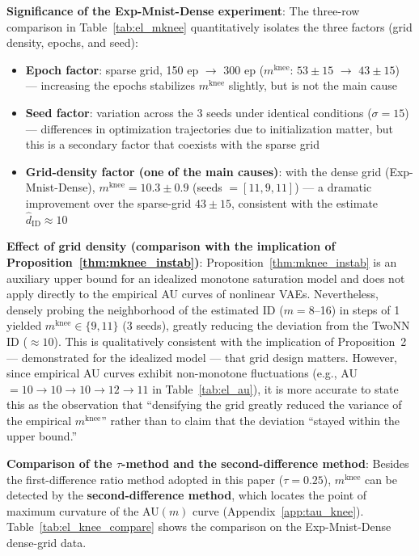 \documentclass[make,article,submit,pdftex,moreauthors]{Definitions/mdpi}
\newcommand{\mknee}{m^{\mathrm{knee}}}
\begin{document}
\textbf{Significance of the Exp-Mnist-Dense experiment}:
The three-row comparison in Table~\ref{tab:el_mknee} quantitatively isolates the three
factors (grid density, epochs, and seed):
\begin{itemize}
  \item \textbf{Epoch factor}: sparse grid, 150 ep $\to$ 300 ep ($\mknee$: $53\pm15$ $\to$ $43\pm15$) --- increasing the epochs stabilizes $\mknee$ slightly, but is not the main cause
  \item \textbf{Seed factor}: variation across the 3 seeds under identical conditions ($\sigma = 15$) --- differences in optimization trajectories due to initialization matter, but this is a secondary factor that coexists with the sparse grid
  \item \textbf{Grid-density factor (one of the main causes)}: with the dense grid (Exp-Mnist-Dense), $\mknee = 10.3 \pm 0.9$ (seeds $=[11,9,11]$) --- a dramatic improvement over the sparse-grid $43\pm15$, consistent with the estimate $\hat{d}_\mathrm{ID} \approx 10$
\end{itemize}

\noindent
\textbf{Effect of grid density (comparison with the implication of Proposition~\ref{thm:mknee_instab})}:
Proposition~\ref{thm:mknee_instab} is an auxiliary upper bound for an idealized monotone
saturation model and does not apply directly to the empirical AU curves of nonlinear VAEs.
Nevertheless, densely probing the neighborhood of the estimated ID ($m = 8$--16) in steps of 1
yielded $\mknee \in \{9, 11\}$ (3 seeds), greatly reducing the deviation from the TwoNN ID
($\approx 10$).
This is qualitatively consistent with the implication of Proposition~2 --- demonstrated for
the idealized model --- that grid design matters.
However, since empirical AU curves exhibit non-monotone fluctuations
(e.g., AU$=10 \to 10 \to 10 \to 12 \to 11$ in Table~\ref{tab:el_au}), it is more accurate to
state this as the observation that ``densifying the grid greatly reduced the variance of the
empirical $\mknee$'' rather than to claim that the deviation ``stayed within the upper bound.''

\noindent
\textbf{Comparison of the $\tau$-method and the second-difference method}:
Besides the first-difference ratio method adopted in this paper ($\tau = 0.25$), $\mknee$ can
be detected by the \textbf{second-difference method}, which locates the point of maximum
curvature of the AU$(m)$ curve (Appendix~\ref{app:tau_knee}).
Table~\ref{tab:el_knee_compare} shows the comparison on the Exp-Mnist-Dense dense-grid data.
\end{document}
